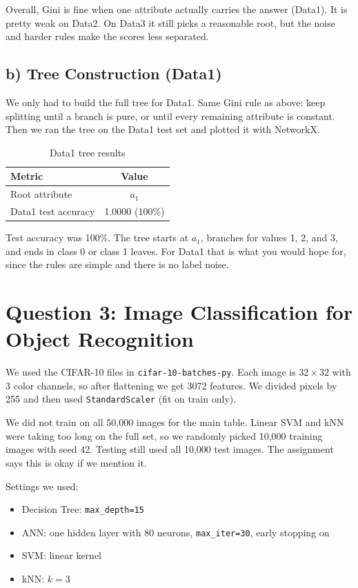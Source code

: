 \documentclass[11pt]{article}
\begin{document}
Overall, Gini is fine when one attribute actually carries the answer (Data1). It is pretty weak on Data2. On Data3 it still picks a reasonable root, but the noise and harder rules make the scores less separated.

\subsection*{b) Tree Construction (Data1)}

We only had to build the full tree for Data1. Same Gini rule as above: keep splitting until a branch is pure, or until every remaining attribute is constant. Then we ran the tree on the Data1 test set and plotted it with NetworkX.

\begin{table}[h!]
\centering
\begin{tabular}{|l|c|}
\hline
\textbf{Metric} & \textbf{Value} \tabularnewline \hline
Root attribute & $a_1$ \tabularnewline \hline
Data1 test accuracy & 1.0000 (100\%) \tabularnewline \hline
\end{tabular}
\caption{Data1 tree results}
\end{table}

Test accuracy was 100\%. The tree starts at $a_1$, branches for values 1, 2, and 3, and ends in class 0 or class 1 leaves. For Data1 that is what you would hope for, since the rules are simple and there is no label noise.

\section*{Question 3: Image Classification for Object Recognition}

We used the CIFAR-10 files in \texttt{cifar-10-batches-py}. Each image is $32 \times 32$ with 3 color channels, so after flattening we get 3072 features. We divided pixels by 255 and then used \texttt{StandardScaler} (fit on train only).

We did not train on all 50,000 images for the main table. Linear SVM and kNN were taking too long on the full set, so we randomly picked 10,000 training images with seed 42. Testing still used all 10,000 test images. The assignment says this is okay if we mention it.

Settings we used:
\begin{itemize}
    \item Decision Tree: \texttt{max\_depth=15}
    \item ANN: one hidden layer with 80 neurons, \texttt{max\_iter=30}, early stopping on
    \item SVM: linear kernel
    \item kNN: $k=3$
\end{itemize}
\end{document}
